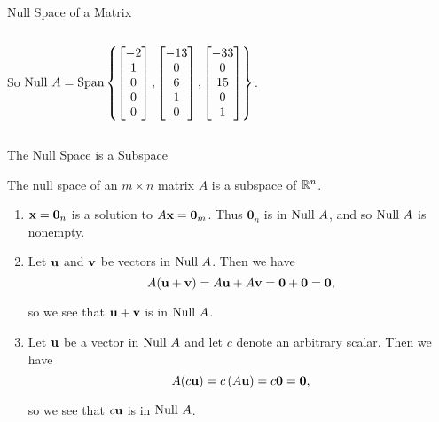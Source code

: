 \documentclass[xcolor=dvipsnames,aspectratio=169,t]{beamer}
\begin{document}
\begin{frame}{Null Space of a Matrix}
\begin{columns}[T]
So $\mbox{Null } A = \text{Span}\left\{
  \begin{bmatrix} -2 \\ 1 \\ 0 \\ 0 \\0 \end{bmatrix},
  \begin{bmatrix} -13 \\ 0 \\6 \\ 1 \\ 0 \end{bmatrix},
  \begin{bmatrix} -33 \\ 0 \\15 \\ 0 \\ 1 \end{bmatrix}
    \right\}$.

\end{columns}

\end{frame}


\begin{frame}{The Null Space is a Subspace}
  \medskip

  \begin{theorem}
  The null space of an $m \times n$ matrix $A$ is a \alert{subspace} of $\mathbb{R}^n$.
  \end{theorem}

  \pause
  \begin{enumerate}[<+->]  %
  \item $\mathbf{x}= \mathbf{0}_n$ is a solution to $A \mathbf{x} = \mathbf{0}_m$. Thus $\mathbf{0}_n$ is in $\mbox{Null } A$, and so $\mbox{Null } A$ is nonempty.
  \smallskip
  
  \item Let $\mathbf{u}$ and $\mathbf{v}$ be vectors in $\mbox{Null } A$. Then we have
  \vspace*{-.5em}
  \[ A (\mathbf{u} + \mathbf{v}) = A\mathbf{u} + A\mathbf{v} = \mathbf{0} + \mathbf{0} = \mathbf{0} ,\]
  \vspace*{-1.5em}
  
  so we see that $\mathbf{u} + \mathbf{v}$ is in $\mbox{Null } A$.
  \smallskip
  
  \item Let $\mathbf{u}$ be a vector in $\mbox{Null } A$ and let $c$ denote an arbitrary scalar. Then we have
  \vspace*{-.5em}
  \[ A (c\mathbf{u})= c \left( A\mathbf{u} \right) =c \mathbf{0} = \mathbf{0} ,\]
  \vspace*{-1.5em}
  
  so we see that $c\mathbf{u}$ is in $\mbox{Null } A$.
  \end{enumerate}

\end{frame}
\end{document}
